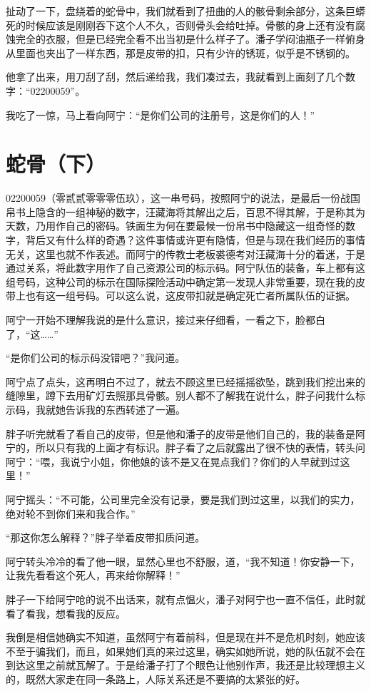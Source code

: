扯动了一下，盘绕着的蛇骨中，我们就看到了扭曲的人的骸骨剩余部分，这条巨蟒死的时候应该是刚刚吞下这个人不久，否则骨头会给吐掉。骨骸的身上还有没有腐蚀完全的衣服，但是已经完全看不出当初是什么样子了。潘子学闷油瓶子一样俯身从里面也夹出了一样东西，那是皮带的扣，只有少许的锈斑，似乎是不锈钢的。

他拿了出来，用刀刮了刮，然后递给我，我们凑过去，我就看到上面刻了几个数字：“02200059”。

我吃了一惊，马上看向阿宁：“是你们公司的注册号，这是你们的人！”

\chapter{蛇骨（下）}

02200059（零贰贰零零零伍玖），这一串号码，按照阿宁的说法，是最后一份战国帛书上隐含的一组神秘的数字，汪藏海将其解出之后，百思不得其解，于是称其为天数，乃用作自己的密码。铁面生为何在要最候一份帛书中隐藏这一组奇怪的数字，背后又有什么样的奇遇？这件事情或许更有隐情，但是与现在我们经历的事情无关，这里也就不作表述。而阿宁的传教士老板裘德考对汪藏海十分的着迷，于是通过关系，将此数字用作了自己资源公司的标示码。阿宁队伍的装备，车上都有这组号码，这种公司的标示在国际探险活动中确定第一发现人非常重要，现在我的皮带上也有这一组号码。可以这么说，这皮带扣就是确定死亡者所属队伍的证据。

阿宁一开始不理解我说的是什么意识，接过来仔细看，一看之下，脸都白了，“这……”

“是你们公司的标示码没错吧？”我问道。

阿宁点了点头，这再明白不过了，就去不顾这里已经摇摇欲坠，跳到我们挖出来的缝隙里，蹲下去用矿灯去照那具骨骸。别人都不了解我在说什么，胖子问我什么标示码，我就她告诉我的东西转述了一遍。

胖子听完就看了看自己的皮带，但是他和潘子的皮带是他们自己的，我的装备是阿宁的，所以只有我的上面才有标识。胖子看了之后就露出了很不快的表情，转头问阿宁：“喂，我说宁小姐，你他娘的该不是又在晃点我们？你们的人早就到过这里！”

阿宁摇头：“不可能，公司里完全没有记录，要是我们到过这里，以我们的实力，绝对轮不到你们来和我合作。”

“那这你怎么解释？”胖子举着皮带扣质问道。

阿宁转头冷冷的看了他一眼，显然心里也不舒服，道，“我不知道！你安静一下，让我先看看这个死人，再来给你解释！”

胖子一下给阿宁呛的说不出话来，就有点愠火，潘子对阿宁也一直不信任，此时就看了看我，想看我的反应。

我倒是相信她确实不知道，虽然阿宁有着前科，但是现在并不是危机时刻，她应该不至于骗我们，而且，如果她们真的来过这里，确实如她所说，她的队伍就不会在到达这里之前就瓦解了。于是给潘子打了个眼色让他别作声，我还是比较理想主义的，既然大家走在同一条路上，人际关系还是不要搞的太紧张的好。

